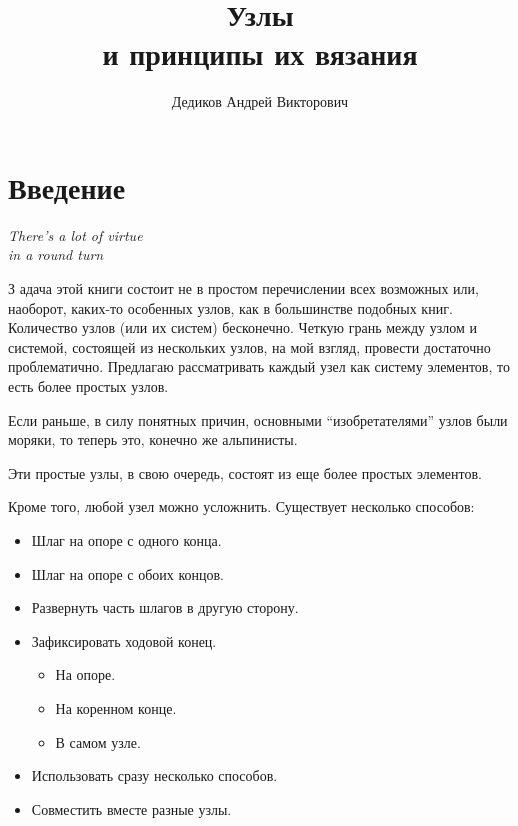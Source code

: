\documentclass{book}
\title{Узлы \\ и принципы их вязания}                %
\date{}                                              %
\author{Дедиков Андрей Викторович}
\begin{document}

\maketitle

\tableofcontents

\setcounter{KnotNoName}{0}
\setcounter{LoopNoName}{0}
\setcounter{HitchNoName}{0}
\setcounter{GachnyNoName}{0}
\setcounter{SamosbrosNoName}{0}
\setcounter{SheepshankNoName}{0}

\chapter*{Введение}

\epigraph{\textit{There's a lot of virtue \\in a round turn}}{}

\lettrine[lines=3,loversize=0.2,nindent=4pt,slope=0pt]{З}{} адача этой книги состоит не в простом перечислении всех возможных или, наоборот, каких-то особенных узлов, как в большинстве подобных книг. Количество узлов (или их систем) бесконечно. Четкую грань между узлом и системой, состоящей из нескольких узлов, на мой взгляд, провести достаточно проблематично. Предлагаю рассматривать каждый узел как систему элементов, то есть более простых узлов.

Если раньше, в силу понятных причин, основными \enquote{изобретателями} узлов были моряки, то теперь это, конечно же альпинисты.


Эти простые узлы, в свою очередь, состоят из еще более простых элементов.

Кроме того, любой узел можно усложнить. Существует несколько способов:

\begin{itemize}
	\item Шлаг на опоре с одного конца.
	\item Шлаг на опоре с обоих концов.
	\item Развернуть часть шлагов в другую сторону.
	\item Зафиксировать ходовой конец.
	\begin{itemize}
		\item На опоре.
		\item На коренном конце.
		\item В самом узле.
	\end{itemize}
	\item Использовать сразу несколько способов.
	\item Совместить вместе разные узлы.
\end{itemize}
\end{document}
